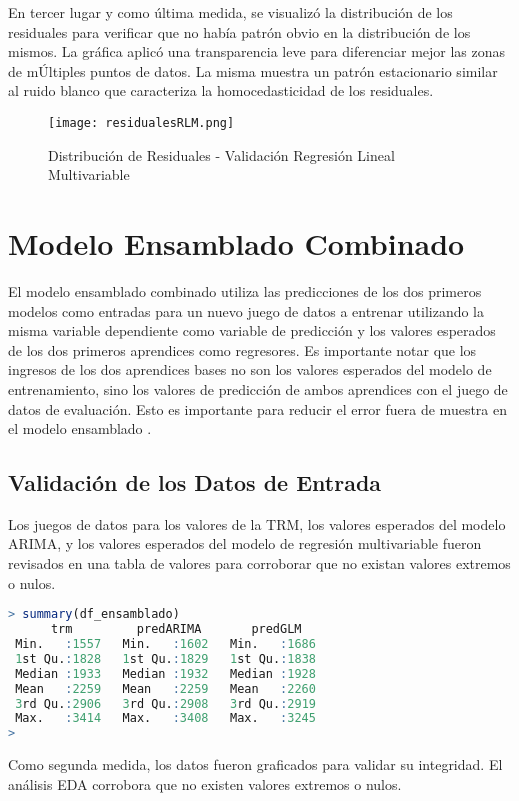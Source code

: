 En tercer lugar y como última medida, se visualizó la distribución de los residuales para verificar que no había patrón obvio en la distribución de los mismos. La gráfica aplicó una transparencia leve para diferenciar mejor las zonas de mÚltiples puntos de datos. La misma muestra un patrón estacionario similar al ruido blanco que caracteriza la homocedasticidad de los residuales.

\begin{figure}[H]
    \centering
    \texttt{[image: residualesRLM.png]}
    \caption{Distribución de Residuales - Validación Regresión Lineal Multivariable}
\end{figure}

\section{Modelo Ensamblado Combinado}
El modelo ensamblado combinado utiliza las predicciones de los dos primeros modelos como entradas para un nuevo juego de datos a entrenar utilizando la misma variable dependiente como variable de predicción y los valores esperados de los dos primeros aprendices como regresores. Es importante notar que los ingresos de los dos aprendices bases no son los valores esperados del modelo de entrenamiento, sino los valores de predicción de ambos aprendices con el juego de datos de evaluación. Esto es importante para reducir el error fuera de muestra en el modelo ensamblado \cite{leek}.

\subsection{Validación de los Datos de Entrada}
Los juegos de datos para los valores de la TRM, los valores esperados del modelo ARIMA, y los valores esperados del modelo de regresión multivariable fueron revisados en una tabla de valores para corroborar que no existan valores extremos o nulos.

\begin{lstlisting}[language=R]
> summary(df_ensamblado)
      trm         predARIMA       predGLM
 Min.   :1557   Min.   :1602   Min.   :1686
 1st Qu.:1828   1st Qu.:1829   1st Qu.:1838
 Median :1933   Median :1932   Median :1928
 Mean   :2259   Mean   :2259   Mean   :2260
 3rd Qu.:2906   3rd Qu.:2908   3rd Qu.:2919
 Max.   :3414   Max.   :3408   Max.   :3245
>
\end{lstlisting}

Como segunda medida, los datos fueron graficados para validar su integridad. El análisis EDA corrobora que no existen valores extremos o nulos.

